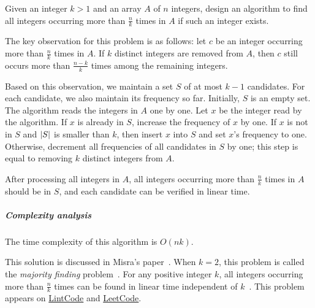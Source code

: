 \begin{Exercise}[title=Majority]
Given an integer $k > 1$ and an array $A$ of $n$ integers, design an algorithm to find all integers occurring more than $\frac{n}{k}$ times in $A$ if such an integer exists.
\end{Exercise}

\begin{Answer}
The key observation for this problem is as follows: let $c$ be an integer occurring more than $\frac{n}{k}$ times in $A$. If $k$ distinct integers are removed from $A$, then $c$ still occurs more than $\frac{n - k}{k}$ times among the remaining integers.

Based on this observation, we maintain a set $S$ of at most $k - 1$ candidates. For each candidate, we also maintain its frequency so far.
Initially, $S$ is an empty set.
The algorithm reads the integers in $A$ one by one. 
Let $x$ be the integer read by the algorithm.
If $x$ is already in $S$, increase the frequency of $x$ by one. 
If $x$ is not in $S$ and $\lvert S\rvert$ is smaller than $k$, then insert $x$ into $S$ and set $x$'s frequency to one. 
Otherwise, decrement all frequencies of all candidates in $S$ by one; this step is equal to removing $k$ distinct integers from $A$.

After processing all integers in $A$, all integers occurring more than $\frac{n}{k}$ times in $A$ should be in $S$, and each candidate can be verified in linear time.
\subparagraph{Complexity analysis} The time complexity of this algorithm is $O(nk)$.
\begin{remark}
This solution is discussed in Misra's paper~\cite{Misra1982}.
When $k = 2$, this problem is called the \emph{majority finding} problem~\cite{Moore1991}.
For any positive integer $k$, all integers occurring more than $\frac{n}{k}$ times can be found in linear time independent of $k$~\cite{Karp2003}. 
This problem appears on \href{http://www.lintcode.com/en/problem/majority-number-iii/}{LintCode} and \href{https://leetcode.com/problems/majority-element-ii/}{LeetCode}.
\end{remark}
\end{Answer}

